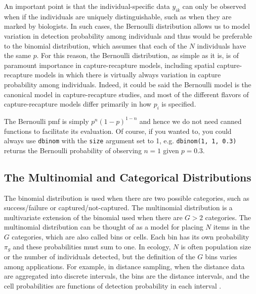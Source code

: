 An important point is that the individual-specific data $y_{ik}$ can only be
observed when if the individuals are uniquely distinguishable, such as when they
are marked by biologists.
In such cases, the Bernoulli distribution allows us to
model variation in detection probability among individuals and thus
would be preferable to the binomial distribution, which assumes that each
of the $N$ individuals have the same $p$.
For this reason, the Bernoulli
distribution, as simple as it is, is of paramount importance in
capture-recapture models, including spatial capture-recapture models
in which there is virtually always variation in capture probability
among individuals. Indeed, it could be said the Bernoulli model is the
canonical model in capture-recapture studies, and most of the
different flavors of capture-recapture models differ primarily in how $p_i$ is
specified. %

The Bernoulli pmf is simply $p^n(1-p)^{1-n}$ and hence we do not need canned
functions to facilitate its evaluation. Of course, if you wanted to, you
could always use \verb+dbinom+ with the \verb+size+ argument set to
1, e.g. \verb+dbinom(1, 1, 0.3)+ returns the Bernoulli probability of
observing $n=1$ given $p=0.3$.

\subsection{The Multinomial and Categorical Distributions}
\label{modeling.sec.multinom}

The binomial distribution is used
when there are two possible categories, such as success/failure or captured/not-captured.
The multinomial distribution is a multivariate extension of
the binomial used when there are $G>2$ categories.
The multinomial distribution can be thought of as a model for placing
$N$ items in the $G$ categories, which are also called bins or cells. Each bin has
its own probability $\pi_g$ and these probabilities must sum to one.
In ecology, $N$ is often population size or the number of individuals
detected, but the definition of the $G$ bins varies among
applications. For example, in distance sampling, when the distance
data are aggregated into discrete intervals,
the bins are the distance intervals, and the cell probabilities are
functions of detection probability in each interval \citep{royle_etal:2004}.

